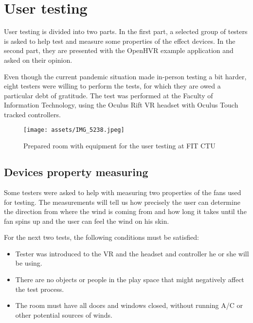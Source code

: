 \chapter{User testing}

User testing is divided into two parts. In the first part,
a selected group of testers is asked to help test and measure some properties
of the effect devices. In the second part, they are presented with the OpenHVR 
example application and asked on their opinion.


Even though the current pandemic situation made in-person testing a bit harder,
eight testers were willing to perform the tests, for which they are owed
a particular debt of gratitude.
The test was performed at the Faculty of Information Technology, using
the Oculus Rift VR headset with Oculus Touch tracked controllers.


\begin{figure}[h]{}
\centering\texttt{[image: assets/IMG\_5238.jpeg]}
\caption{Prepared room with equipment for the user testing at FIT CTU}
\end{figure}

\hypertarget{x-devices-property-measuring}{\section{Devices property measuring}}
Some testers were asked to help with measuring two properties of the fans used
for testing. The measurements will tell us how precisely the user can determine the
direction from where the wind is coming from and how long it takes until the
fan spins up and the user can feel the wind on his skin.


For the next two tests, the following conditions must be satisfied:


\begin{itemize}

\item Tester was introduced to the VR and the headset and controller
he or she will be using.

\item There are no objects or people in the play space that might negatively affect
the test process.

\item The room must have all doors and windows closed, without running A/C
or other potential sources of winds.

\end{itemize}


